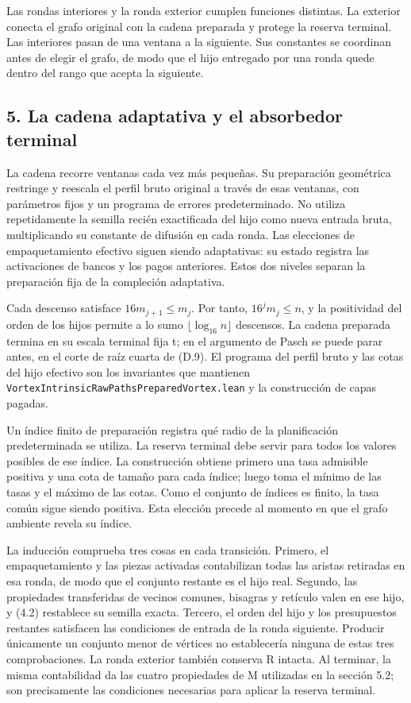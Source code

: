 \documentclass[spanish,11pt,a4paper]{article}
\begin{document}
Las rondas interiores y la ronda exterior cumplen funciones distintas. La exterior conecta el grafo original con la cadena preparada y protege la reserva terminal. Las interiores pasan de una ventana a la siguiente. Sus constantes se coordinan antes de elegir el grafo, de modo que el hijo entregado por una ronda quede dentro del rango que acepta la siguiente.

\subsection{5. La cadena adaptativa y el absorbedor terminal}\label{la-cadena-adaptativa-y-el-absorbedor-terminal}

La cadena recorre ventanas cada vez más pequeñas. Su preparación geométrica restringe y reescala el perfil bruto original a través de esas ventanas, con parámetros fijos y un programa de errores predeterminado. No utiliza repetidamente la semilla recién exactificada del hijo como nueva entrada bruta, multiplicando su constante de difusión en cada ronda. Las elecciones de empaquetamiento efectivo siguen siendo adaptativas: su estado registra las activaciones de bancos y los pagos anteriores. Estos dos niveles separan la preparación fija de la compleción adaptativa.

Cada descenso satisface \(16m_{j+1}\leq m_j\). Por tanto, \(16^jm_j\leq n\), y la positividad del orden de los hijos permite a lo sumo \(\lfloor\log_{16}n\rfloor\) descensos. La cadena preparada termina en su escala terminal fija t; en el argumento de Pasch se puede parar antes, en el corte de raíz cuarta de (D.9). El programa del perfil bruto y las cotas del hijo efectivo son los invariantes que mantienen \texttt{Vortex\allowbreak{}Intrinsic\allowbreak{}Raw\allowbreak{}Paths\allowbreak{}Prepared\allowbreak{}Vortex.\allowbreak{}lean} y la construcción de capas pagadas.

Un índice finito de preparación registra qué radio de la planificación predeterminada se utiliza. La reserva terminal debe servir para todos los valores posibles de ese índice. La construcción obtiene primero una tasa admisible positiva y una cota de tamaño para cada índice; luego toma el mínimo de las tasas y el máximo de las cotas. Como el conjunto de índices es finito, la tasa común sigue siendo positiva. Esta elección precede al momento en que el grafo ambiente revela su índice.

La inducción comprueba tres cosas en cada transición. Primero, el empaquetamiento y las piezas activadas contabilizan todas las aristas retiradas en esa ronda, de modo que el conjunto restante es el hijo real. Segundo, las propiedades transferidas de vecinos comunes, bisagras y retículo valen en ese hijo, y (4.2) restablece su semilla exacta. Tercero, el orden del hijo y los presupuestos restantes satisfacen las condiciones de entrada de la ronda siguiente. Producir únicamente un conjunto menor de vértices no establecería ninguna de estas tres comprobaciones. La ronda exterior también conserva R intacta. Al terminar, la misma contabilidad da las cuatro propiedades de M utilizadas en la sección 5.2; son precisamente las condiciones necesarias para aplicar la reserva terminal.
\end{document}
